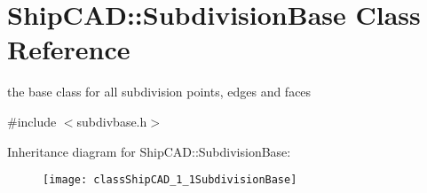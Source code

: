 \hypertarget{classShipCAD_1_1SubdivisionBase}{}\section{Ship\+C\+AD\+:\+:Subdivision\+Base Class Reference}
\label{classShipCAD_1_1SubdivisionBase}


the base class for all subdivision points, edges and faces  




{\ttfamily \#include $<$subdivbase.\+h$>$}

Inheritance diagram for Ship\+C\+AD\+:\+:Subdivision\+Base\+:\begin{figure}[H]
\begin{center}
\leavevmode
\texttt{[image: classShipCAD\_1\_1SubdivisionBase]}
\end{center}
\end{figure}
